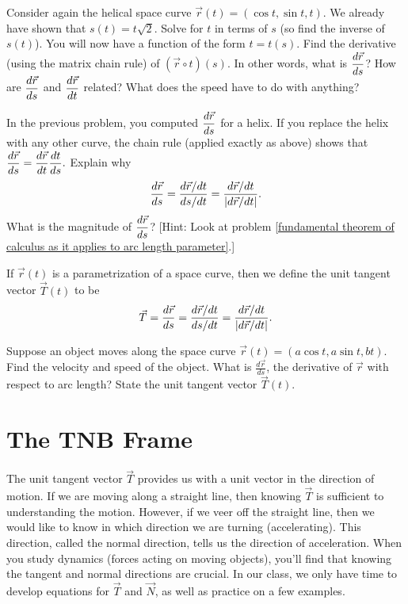 \begin{problem}
 Consider again the helical space curve $\vec r(t)=(\cos t, \sin t, t)$.  We already have shown that $s(t) = t\sqrt{2}$. Solve for $t$ in terms of $s$ (so find the inverse of $s(t)$). You will now have a function of the form $t=t(s)$.  Find the derivative (using the matrix chain rule) of $(\vec r\circ t)(s)$. In other words, what is $\displaystyle\frac{d\vec r}{ds}$? How are $\displaystyle\frac{d\vec r}{ds}$  and $\displaystyle\frac{d\vec r}{dt}$ related?  What does the speed have to do with anything?
\end{problem}

\begin{problem}
In the previous problem, you computed $\displaystyle\frac{d\vec r}{ds}$ for a helix. If you replace the helix with any other curve, the chain rule (applied exactly as above) shows that $\displaystyle\frac{d\vec r}{ds} = \frac{d\vec r}{dt}\frac{dt}{ds}.$
Explain why $$\displaystyle\frac{d\vec r}{ds} =\displaystyle\frac{d\vec r/dt}{ds/dt} = \frac{d\vec r/dt}{|d\vec r/dt|}.$$
What is the magnitude of $\displaystyle\frac{d\vec r}{ds}$? 
[Hint: Look at problem \ref{fundamental theorem of calculus as it applies to arc length parameter}.] 
\end{problem}


\begin{definition}
 If $\vec r(t)$ is a parametrization of a space curve, then we define the unit tangent vector $\vec T(t)$ to be 
$$\vec T = \displaystyle\frac{d\vec r}{ds}=\displaystyle\frac{d\vec r/dt}{ds/dt} = \frac{d\vec r/dt}{|d \vec r/dt|}.$$
\end{definition}

\begin{problem}
 Suppose an object moves along the space curve $\vec r(t)=(a\cos t,a\sin t,b t)$. Find the velocity and speed of the object. What is $\frac{d\vec r}{ds}$, the derivative of $\vec r$ with respect to arc length?  State the unit tangent vector $\vec T(t)$.
\end{problem}

\section{The TNB Frame}
The unit tangent vector $\vec T$ provides us with a unit vector in the direction of motion. If we are moving along a straight line, then knowing $\vec T$ is sufficient to understanding the motion.  However, if we veer off the straight line, then we would like to know in which direction we are turning (accelerating).  This direction, called the normal direction, tells us the direction of acceleration. When you study dynamics (forces acting on moving objects), you'll find that knowing the tangent and normal directions are crucial. In our class, we only have time to develop equations for $\vec T$ and $\vec N$, as well as practice on a few examples. 

